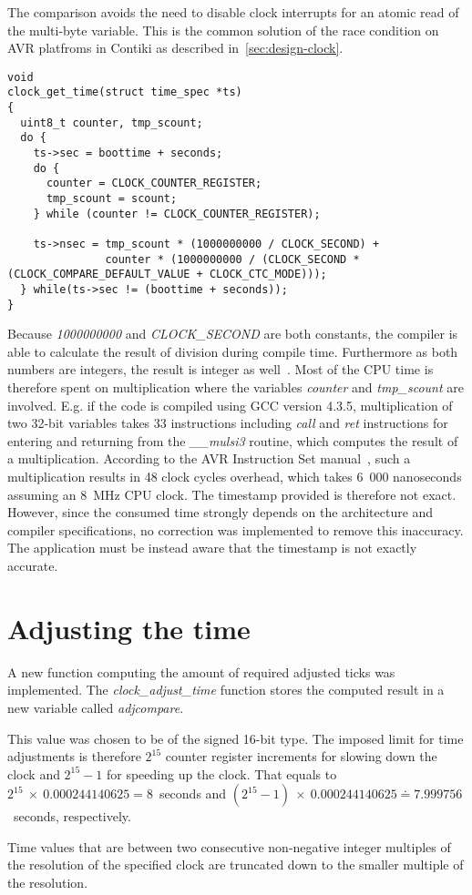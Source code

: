 The comparison avoids the need to disable clock interrupts for an atomic
read of the multi-byte variable.
This is the common solution of the race condition
on AVR platfroms in Contiki as described in~\ref{sec:design-clock}.
\begin{lstlisting}
void
clock_get_time(struct time_spec *ts)
{
  uint8_t counter, tmp_scount;
  do {
    ts->sec = boottime + seconds;
    do {
      counter = CLOCK_COUNTER_REGISTER;
      tmp_scount = scount;
    } while (counter != CLOCK_COUNTER_REGISTER);

    ts->nsec = tmp_scount * (1000000000 / CLOCK_SECOND) +
               counter * (1000000000 / (CLOCK_SECOND * (CLOCK_COMPARE_DEFAULT_VALUE + CLOCK_CTC_MODE)));
  } while(ts->sec != (boottime + seconds));
}
\end{lstlisting}
Because {\it{1000000000}} and {\it{CLOCK\_SECOND}} are both constants, the compiler is able to
calculate the result of division during compile time.
Furthermore as both numbers are integers, the result is integer as well~\cite{c99}.
Most of the CPU time is therefore spent on multiplication where the variables
{\it{counter}} and {\it{tmp\_scount}} are involved.
E.g. if the code is compiled using GCC version 4.3.5,
multiplication of two 32-bit variables takes 33 instructions including {\it{call}} and {\it{ret}}
instructions for entering and returning from the {\it{\_\_mulsi3}} routine, which computes
the result of a multiplication.
According to the AVR Instruction Set manual~\cite{avr-instruction-set},
such a multiplication results in 48 clock cycles overhead,
which takes 6~000 nanoseconds assuming an 8~MHz CPU clock.
The timestamp provided is therefore not exact.
However, since the consumed time strongly depends on the architecture and compiler specifications,
no correction was implemented to remove this inaccuracy.
The application must be instead aware that the timestamp is not exactly accurate.

\section{Adjusting the time}
A new function computing the amount of required adjusted ticks was implemented.
The {\it{clock\_adjust\_time}} function stores the computed result in
a new variable called {\it{adjcompare}}.

This value was chosen to be of the signed 16-bit type.
The imposed limit for time adjustments is therefore $2^{15}$ counter register increments
for slowing down the clock and $2^{15}-1$ for speeding up the clock.
That equals to $2^{15}~\times~0.000244140625 = 8$~seconds
and $(2^{15} - 1)~\times~0.000244140625 \doteq 7.999756$~seconds, respectively.


Time values that are between two consecutive non-negative integer multiples
of the resolution of the specified clock are truncated down to the smaller multiple of the resolution.




